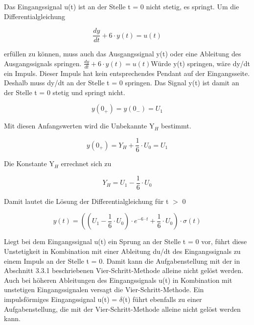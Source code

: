 \noindent Das Eingangssignal u(t) ist an der Stelle t = 0 nicht stetig, es springt. Um die Differentialgleichung 

\begin{equation}\label{eq:ninetyeight}
\frac{dy}{dt} +6\cdot y\left(t\right)=u\left(t\right)
\end{equation}

\noindent erfüllen zu können, muss auch das Ausgangssignal y(t) oder eine Ableitung des Ausgangssignals springen. $\frac{dy}{dt} +6\cdot y\left(t\right)=u\left(t\right)$W\"{u}rde y(t) springen, wäre dy/dt ein Impuls. Dieser Impuls hat kein entsprechendes Pendant auf der Eingangsseite. Deshalb muss dy/dt an der Stelle t = 0 springen. Das Signal y(t) ist damit an der Stelle t = 0 stetig und springt nicht. 

\begin{equation}\label{eq:ninetynine}
y\left(0_{+} \right)=y\left(0_{-} \right)=U_{1}
\end{equation}

\noindent Mit diesen Anfangswerten wird die Unbekannte Y${}_{H}$ bestimmt. 

\begin{equation}\label{eq:hundred}
y\left(0_{+} \right)=Y_{H} +\frac{1}{6} \cdot U_{0} =U_{1} 
\end{equation}

\noindent Die Konstante Y${}_{H}$ errechnet sich zu

\begin{equation}\label{eq:hundredone}
Y_{H} =U_{1} -\frac{1}{6} \cdot U_{0} 
\end{equation}

\noindent Damit lautet die Lösung der Differentialgleichung für t $\mathrm{>}$ 0 

\begin{equation}\label{eq:hundredtwo}
y\left(t\right)=\left(\left(U_{1} -\frac{1}{6} \cdot U_{0} \right)\cdot e^{-6\cdot t} +\frac{1}{6} \cdot U_{0} \right)\cdot \sigma \left(t\right)
\end{equation}

\noindent Liegt bei dem Eingangssignal u(t) ein Sprung an der Stelle t = 0 vor, führt diese Unstetigkeit in Kombination mit einer Ableitung du/dt des Eingangssignals zu einem Impuls an der Stelle t = 0. Damit kann die Aufgabenstellung mit der in Abschnitt 3.3.1 beschriebenen Vier-Schritt-Methode alleine nicht gelöst werden. Auch bei höheren Ableitungen des Eingangssignals u(t) in Kombination mit unstetigen Eingangssignalen versagt die Vier-Schritt-Methode. Ein impulsförmiges Eingangssignal u(t) = $\delta$(t) führt ebenfalls zu einer Aufgabenstellung, die mit der Vier-Schritt-Methode alleine nicht gelöst werden kann. 

